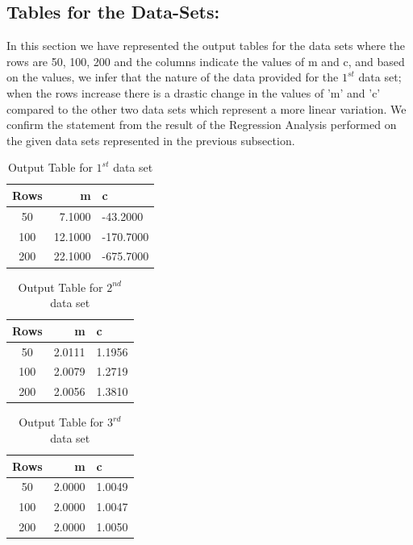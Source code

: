 \documentclass[12pt,a4paper]{article}
\begin{document}
\subsection{Tables for the Data-Sets:}
In this section we have represented the output tables for the data sets where the rows are 50, 100, 200 and the columns indicate the values of m and c, and based on the values, we infer that the nature of the data provided for the $1^{st}$ data set; when the rows increase there is a drastic change in the values of 'm' and 'c' compared to the other two data sets which represent a more linear variation. We confirm the statement from the result of the Regression Analysis performed on the given data sets represented in the previous subsection. 
\begin{table}[!ht]
	\begin{center}
\begin{tabular}{|c|r|l|}
\hline
Rows & m & c \\
\hline
50 & 7.1000 & -43.2000 \\
100 & 12.1000 & -170.7000 \\
200 & 22.1000 & -675.7000 \\
\hline
\end{tabular}
	\caption{Output Table for $1^{st}$ data set}
	\label{tab:progs}
	\end{center}
\end{table}
\begin{table}[!ht]
	\begin{center}
\begin{tabular}{|c|r|l|}
\hline
Rows & m & c \\
\hline
50 & 2.0111 & 1.1956 \\
100 & 2.0079 & 1.2719 \\
200 & 2.0056 & 1.3810 \\
\hline
\end{tabular}
	\caption{Output Table for $2^{nd}$ data set}
	\label{tab:progs}
	\end{center}
\end{table}
\clearpage
\begin{table}[!ht]
	\begin{center}
\begin{tabular}{|c|r|l|}
\hline
Rows & m & c \\
\hline
50 & 2.0000 & 1.0049 \\
100 & 2.0000 & 1.0047 \\
200 & 2.0000 & 1.0050 \\
\hline
\end{tabular}
	\caption{Output Table for $3^{rd}$ data set}
	\label{tab:progs}
	\end{center}
\end{table}
\end{document}
